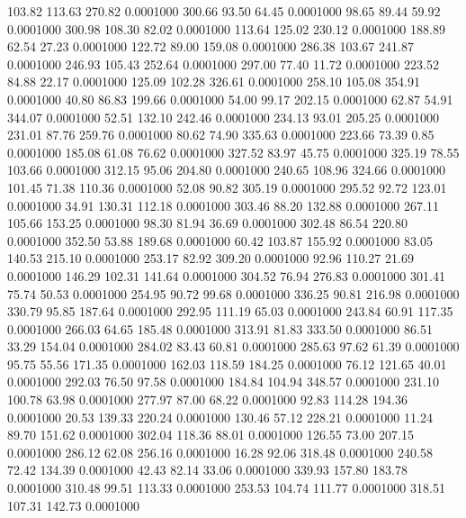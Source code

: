  103.82  113.63  270.82   0.0001000
 300.66   93.50   64.45   0.0001000
  98.65   89.44   59.92   0.0001000
 300.98  108.30   82.02   0.0001000
 113.64  125.02  230.12   0.0001000
 188.89   62.54   27.23   0.0001000
 122.72   89.00  159.08   0.0001000
 286.38  103.67  241.87   0.0001000
 246.93  105.43  252.64   0.0001000
 297.00   77.40   11.72   0.0001000
 223.52   84.88   22.17   0.0001000
 125.09  102.28  326.61   0.0001000
 258.10  105.08  354.91   0.0001000
  40.80   86.83  199.66   0.0001000
  54.00   99.17  202.15   0.0001000
  62.87   54.91  344.07   0.0001000
  52.51  132.10  242.46   0.0001000
 234.13   93.01  205.25   0.0001000
 231.01   87.76  259.76   0.0001000
  80.62   74.90  335.63   0.0001000
 223.66   73.39    0.85   0.0001000
 185.08   61.08   76.62   0.0001000
 327.52   83.97   45.75   0.0001000
 325.19   78.55  103.66   0.0001000
 312.15   95.06  204.80   0.0001000
 240.65  108.96  324.66   0.0001000
 101.45   71.38  110.36   0.0001000
  52.08   90.82  305.19   0.0001000
 295.52   92.72  123.01   0.0001000
  34.91  130.31  112.18   0.0001000
 303.46   88.20  132.88   0.0001000
 267.11  105.66  153.25   0.0001000
  98.30   81.94   36.69   0.0001000
 302.48   86.54  220.80   0.0001000
 352.50   53.88  189.68   0.0001000
  60.42  103.87  155.92   0.0001000
  83.05  140.53  215.10   0.0001000
 253.17   82.92  309.20   0.0001000
  92.96  110.27   21.69   0.0001000
 146.29  102.31  141.64   0.0001000
 304.52   76.94  276.83   0.0001000
 301.41   75.74   50.53   0.0001000
 254.95   90.72   99.68   0.0001000
 336.25   90.81  216.98   0.0001000
 330.79   95.85  187.64   0.0001000
 292.95  111.19   65.03   0.0001000
 243.84   60.91  117.35   0.0001000
 266.03   64.65  185.48   0.0001000
 313.91   81.83  333.50   0.0001000
  86.51   33.29  154.04   0.0001000
 284.02   83.43   60.81   0.0001000
 285.63   97.62   61.39   0.0001000
  95.75   55.56  171.35   0.0001000
 162.03  118.59  184.25   0.0001000
  76.12  121.65   40.01   0.0001000
 292.03   76.50   97.58   0.0001000
 184.84  104.94  348.57   0.0001000
 231.10  100.78   63.98   0.0001000
 277.97   87.00   68.22   0.0001000
  92.83  114.28  194.36   0.0001000
  20.53  139.33  220.24   0.0001000
 130.46   57.12  228.21   0.0001000
  11.24   89.70  151.62   0.0001000
 302.04  118.36   88.01   0.0001000
 126.55   73.00  207.15   0.0001000
 286.12   62.08  256.16   0.0001000
  16.28   92.06  318.48   0.0001000
 240.58   72.42  134.39   0.0001000
  42.43   82.14   33.06   0.0001000
 339.93  157.80  183.78   0.0001000
 310.48   99.51  113.33   0.0001000
 253.53  104.74  111.77   0.0001000
 318.51  107.31  142.73   0.0001000
